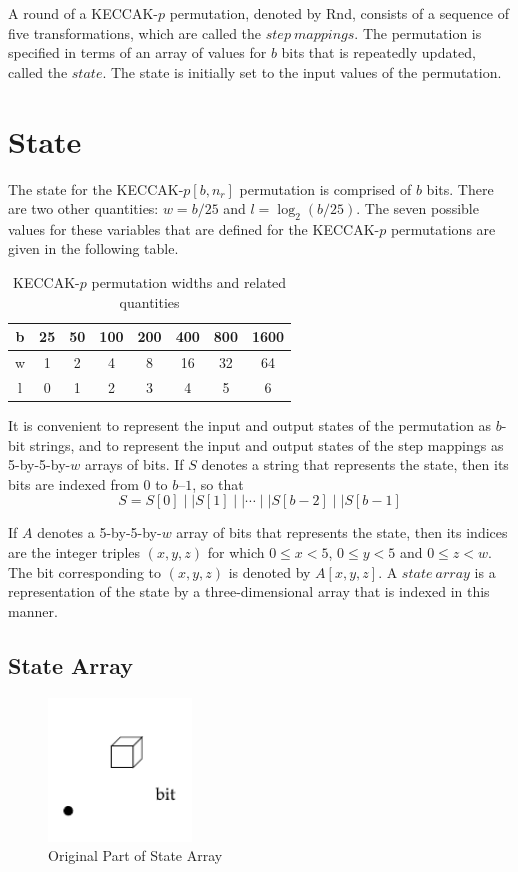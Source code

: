 \documentclass[12pt,a4paper,oneside]{report}
\begin{document}
A round of a KECCAK-$p$ permutation, denoted by Rnd, consists of a sequence of five transformations, which are called the $step\ mappings$. The permutation is specified in terms of an array of values for $b$ bits that is repeatedly updated, called the $state$. The state is initially set to the input values of the permutation.

\section{State}
The state for the KECCAK-$p[b, n_r]$ permutation is comprised of $b$ bits. There are two other quantities: $w=b/25$ and $l=\log_2 (b/25)$. The seven possible values for these variables that are defined for the KECCAK-$p$ permutations are given in the following table.

\begin{table}[H]
  \centering
  \caption{KECCAK-$p$ permutation widths and related quantities}
    \begin{tabular}{cccccccc}
    \toprule
    b & 25 & 50 & 100 & 200 & 400 & 800 & 1600 \\
    \midrule
    w & 1 & 2 & 4 & 8 & 16 & 32 & 64 \\
    \midrule
    l & 0 & 1 & 2 & 3 & 4 & 5 & 6 \\
    \bottomrule
    \end{tabular}
\end{table}%

It is convenient to represent the input and output states of the permutation as $b$-bit strings, and to represent the input and output states of the step mappings as 5-by-5-by-$w$ arrays of bits. If $S$ denotes a string that represents the state, then its bits are indexed from 0 to $b–1$, so that
$$S=S[0] \mid\mid S[1] \mid\mid \cdots \mid\mid S[b-2] \mid\mid S[b-1]$$

If $A$ denotes a 5-by-5-by-$w$ array of bits that represents the state, then its indices are the integer triples $(x,y,z)$ for which $0 \leq x < 5$, $0 \leq y < 5$ and $0 \leq z < w$. The bit corresponding to $(x,y,z)$ is denoted by $A[x,y,z]$. A $state\ array$ is a representation of the state by a three-dimensional array that is indexed in this manner.

\subsection{State Array}
\begin{figure}[H]
\centering
\includegraphics[width=1.5in]{imgs/origin.png}
\caption{Original Part of State Array} 
\end{figure}
\end{document}
